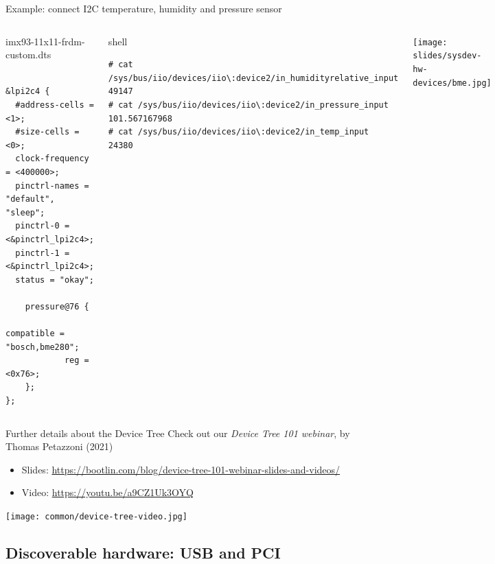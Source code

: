 \begin{frame}[fragile]{Example: connect I2C temperature, humidity and pressure sensor}
  \begin{columns}
    \begin{block}{imx93-11x11-frdm-custom.dts}
      {\tiny
\begin{verbatim}

&lpi2c4 {
  #address-cells = <1>;
  #size-cells = <0>;
  clock-frequency = <400000>;
  pinctrl-names = "default", "sleep";
  pinctrl-0 = <&pinctrl_lpi2c4>;
  pinctrl-1 = <&pinctrl_lpi2c4>;
  status = "okay";

    pressure@76 {
            compatible = "bosch,bme280";
            reg = <0x76>;
    };
};

\end{verbatim}
}
  \end{block}

\begin{block}{shell}
{\tiny
\begin{verbatim}
# cat /sys/bus/iio/devices/iio\:device2/in_humidityrelative_input
49147
# cat /sys/bus/iio/devices/iio\:device2/in_pressure_input
101.567167968
# cat /sys/bus/iio/devices/iio\:device2/in_temp_input
24380
\end{verbatim}
}
\end{block}
  \begin{center}
    \texttt{[image: slides/sysdev-hw-devices/bme.jpg]}
  \end{center}
\end{columns}
\end{frame}

\begin{frame}{Further details about the Device Tree}
\small
Check out our {\em Device Tree 101 webinar}, by Thomas Petazzoni (2021)
\begin{itemize}
    \item Slides: \url{https://bootlin.com/blog/device-tree-101-webinar-slides-and-videos/}\\
    \item Video: \url{https://youtu.be/a9CZ1Uk3OYQ}
\end{itemize}
\vspace{0.5cm}
\texttt{[image: common/device-tree-video.jpg]}
\end{frame}

\subsection{Discoverable hardware: USB and PCI}

